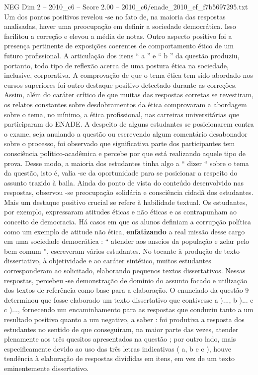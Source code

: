 \begin{textsample}{NEG Dim 2 – 2010\_c6 – Score 2.00 – 2010\_c6/enade\_2010\_ef\_f7b5697295.txt}
Um dos pontos positivos revelou -se no fato de, na maioria das respostas analisadas, haver uma preocupação em definir a sociedade democrática.
Isso facilitou a correção e elevou a média de notas.
Outro aspecto positivo foi a presença pertinente de exposições coerentes de comportamento ético de um futuro profissional.
A articulação dos itens “ a ” e “ b ” da questão produziu, portanto, todo tipo de reflexão acerca de uma postura ética na sociedade, inclusive, corporativa.
A comprovação de que o tema ética tem sido abordado nos cursos superiores foi outro destaque positivo detectado durante as correções.
Assim, além do caráter crítico de que muitas das respostas corretas se revestiram, os relatos constantes sobre desdobramentos da ética comprovaram a abordagem sobre o tema, no mínimo, a ética profissional, nas carreiras universitárias que participaram do ENADE.
A despeito de alguns estudantes se posicionarem contra o exame, seja anulando a questão ou escrevendo algum comentário desabonador sobre o processo, foi observado que significativa parte dos participantes tem consciência político-acadêmica e percebe por que está realizando aquele tipo de prova.
Desse modo, a maioria dos estudantes tinha algo a “ dizer “ sobre o tema da questão, isto é, valia -se da oportunidade para se posicionar a respeito do assunto trazido à baila.
Ainda do ponto de vista do conteúdo desenvolvido nas respostas, observou -se preocupação solidária e consciência cidadã dos estudantes.
Mais um destaque positivo crucial se refere à habilidade textual.
Os estudantes, por exemplo, expressaram atitudes éticas e não éticas e as contrapunham ao conceito de democracia.
Há casos em que os alunos definiam a corrupção política como um exemplo de atitude não ética, \textbf{enfatizando} a real missão desse cargo em uma sociedade democrática : “ atender aos anseios da população e zelar pelo bem comum ”, escreveram vários estudantes.
No tocante à produção de texto dissertativo, à objetividade e ao caráter sintético, muitos estudantes corresponderam ao solicitado, elaborando pequenos textos dissertativos.
Nessas respostas, percebeu -se demonstração de domínio do assunto focado e utilização dos textos de referência como base para a elaboração.
O enunciado da questão 9 determinou que fosse elaborado um texto dissertativo que contivesse a )..., b )... e c )..., fornecendo um encaminhamento para as respostas que conduziu tanto a um resultado positivo quanto a um negativo, a saber : foi produtiva a resposta dos estudantes no sentido de que conseguiram, na maior parte das vezes, atender plenamente aos três quesitos apresentados na questão ; por outro lado, mais especificamente devido ao uso das três letras indicativas ( a, b e c ), houve tendência à elaboração de respostas divididas em itens, em vez de um texto eminentemente dissertativo.

\end{textsample}
